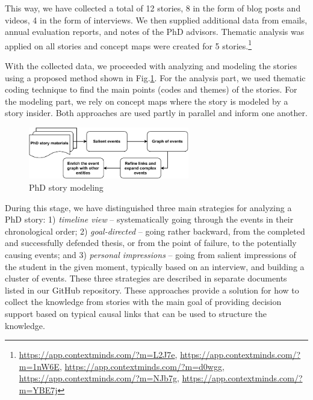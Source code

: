 \documentclass[sigconf]{acmart}
\begin{document}

This way, we have collected a total of 12 stories, 8 in the form of blog posts and videos, 4 in the form of interviews. We then supplied additional data from emails, annual evaluation reports, and notes of the PhD advisors. Thematic analysis was applied on all stories and concept maps were created for 5 stories.\footnote{
\url{https://app.contextminds.com/?m=L2J7e}, 
\url{https://app.contextminds.com/?m=1nW6E}, 
\url{https://app.contextminds.com/?m=d0wgg}, 
\url{https://app.contextminds.com/?m=NJb7g}, 
\url{https://app.contextminds.com/?m=YBE7j}
}


With the collected data, we proceeded with analyzing and modeling the stories using a proposed method shown in Fig.\ref{fig:story-modeling}. For the analysis part, we used thematic coding technique to find the main points (codes and themes) of the stories. %
For the modeling part, we rely on concept maps where the story is modeled by a story insider. %
Both approaches are used partly in parallel and inform one another.

\begin{figure}[ht]
  \centering
  \includegraphics[width=7cm]{pictures/story-modeling.pdf}
  \caption[story-modeling]{PhD story modeling}
  \label{fig:story-modeling}
\end{figure}

During this stage, we have distinguished three main strategies for analyzing a PhD story: 1) \textit{timeline view} -- systematically going through the events in their chronological order; 2) \textit{goal-directed} -- going rather backward, from the completed and successfully defended thesis, or from the point of failure, to the potentially causing events; and 3) \textit{personal impressions} -- going from salient impressions of the student in the given moment, typically based on an interview, and building a cluster of events. These three strategies are described in separate documents listed in our GitHub repository. These approaches provide a solution for how to collect the knowledge from stories with the main goal of providing decision support based on typical causal links that can be used to structure the knowledge.
\end{document}
